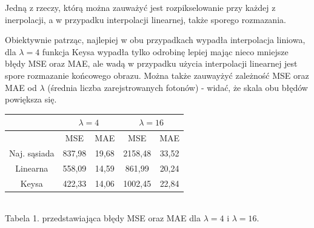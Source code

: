 \documentclass[14pt]{article}
\begin{document}
\begin{center}
    Jedną z rzeczy, którą można zauważyć jest rozpikselowanie przy każdej
    z inerpolacji, a w przypadku interpolacji linearnej, także sporego rozmazania.

    \vspace{0.2cm}
    Obiektywnie patrząc, najlepiej w 
    obu przypadkach wypadła interpolacja liniowa, dla $\lambda=4$ 
    funkcja Keysa wypadła tylko odrobinę lepiej mając nieco mniejsze 
    błędy MSE oraz MAE, ale wadą w przypadku użycia interpolacji linearnej
    jest spore rozmazanie końcowego obrazu. Można także zauwayżyć zależność
    MSE oraz MAE od $\lambda$ (średnia liczba zarejstrowanych fotonów)
    - widać, że skala obu błędów powiększa się.


    \vspace{0.25cm}
    \begin{tabular}{|c|c|c|c|c|}
        \hline
        & \multicolumn{2}{|c|}{$\lambda = 4$} & \multicolumn{2}{|c|}{$\lambda = 16$}\\ \hline
        & MSE & MAE & MSE & MAE \\ \hline
        Naj. sąsiada & 837,98 & 19,68 & 2158,48 & 33,52 \\ \hline
        Linearna & 558,09 & 14,59 & 861,99 & 20,24 \\ \hline
        Keysa & 422,33 & 14,06 & 1002,45 & 22,84 \\ \hline

    \end{tabular}
    \vspace{0.2cm}
    \\ \small Tabela 1. przedstawiająca błędy MSE oraz MAE dla $\lambda=4$ i $\lambda=16$.
\end{center}
\end{document}
